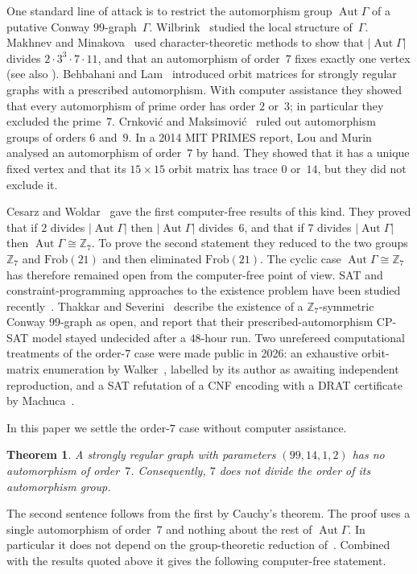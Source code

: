 \documentclass[11pt,a4paper]{amsart}
\newtheorem{theorem}{Theorem}[section]
\theoremstyle{definition}
\theoremstyle{remark}
\newcommand{\Z}{\mathbb{Z}}
\DeclareMathOperator{\Aut}{Aut}
\begin{document}
One standard line of attack is to restrict the automorphism group $\Aut\Gamma$ of a putative Conway
$99$-graph~$\Gamma$. Wilbrink~\cite{W84} studied the local structure of~$\Gamma$. Makhnev and
Minakova~\cite{MM04} used character-theoretic methods to show that $|\Aut\Gamma|$ divides
$2\cdot3^3\cdot7\cdot11$, and that an automorphism of order~$7$ fixes exactly one vertex (see also
\cite[Theorem~1.6]{B09}). Behbahani and
Lam~\cite{B09,BL11} introduced orbit matrices for strongly regular graphs with a prescribed automorphism.
With computer assistance they showed that every automorphism of prime order has order $2$ or~$3$; in
particular they excluded the prime~$7$. Crnković and Maksimović~\cite{CM20} ruled out automorphism groups of
orders $6$ and~$9$. In a 2014 MIT PRIMES report, Lou and Murin~\cite{LM14} analysed an automorphism of
order~$7$ by hand. They showed that it has a unique fixed vertex and that its $15\times15$ orbit matrix
has trace $0$ or~$14$, but they did not exclude it.

Cesarz and Woldar~\cite{CW25} gave the first computer-free results of this kind. They proved that if $2$
divides $|\Aut\Gamma|$ then $|\Aut\Gamma|$ divides~$6$, and that if $7$ divides $|\Aut\Gamma|$ then
$\Aut\Gamma\cong\Z_7$. To prove the second statement they reduced to the two groups $\Z_7$ and
$\mathrm{Frob}(21)$ and then eliminated $\mathrm{Frob}(21)$. The cyclic case $\Aut\Gamma\cong\Z_7$ has
therefore remained open from the computer-free point of view. SAT and constraint-programming approaches to
the existence problem have been studied recently~\cite{K26,TS26}. Thakkar and Severini~\cite{TS26} describe the
existence of a $\Z_7$-symmetric Conway $99$-graph as open, and report that their prescribed-automorphism
CP-SAT model stayed undecided after a $48$-hour run. Two unrefereed computational treatments of the
order-$7$ case were made public in 2026: an exhaustive orbit-matrix enumeration by Walker~\cite{Wa26}, labelled
by its author as awaiting independent reproduction, and a SAT refutation of a CNF encoding with a
DRAT certificate by Machuca~\cite{Ma26}.

In this paper we settle the order-$7$ case without computer assistance.

\begin{theorem}\label{thm:main}
A strongly regular graph with parameters $(99,14,1,2)$ has no automorphism of order~$7$. Consequently,
$7$ does not divide the order of its automorphism group.
\end{theorem}

The second sentence follows from the first by Cauchy's theorem. The proof uses a single automorphism of
order~$7$ and nothing about the rest of $\Aut\Gamma$. In particular it does not depend on the group-theoretic
reduction of~\cite{CW25}. Combined with the results quoted above it gives the following computer-free
statement.
\end{document}
